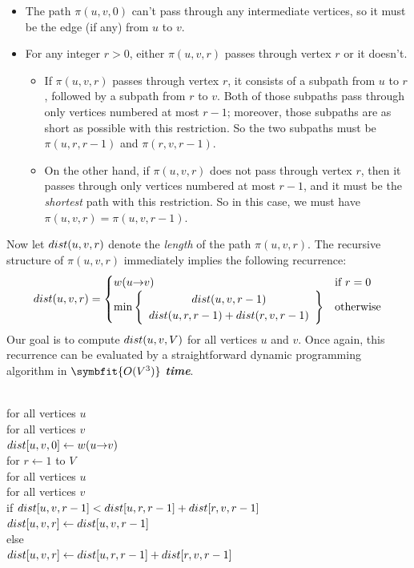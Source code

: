 \begin{itemize}
\item The path $\pi(u, v, 0)$ can’t pass through any intermediate vertices, so it must be the edge (if any) from $u$ to $v$.
\item For any integer $r > 0$, either $\pi(u, v, r)$ passes through vertex $r$ or it doesn’t.
\begin{itemize}[label=\normalfont\bfseries\textendash]
\item If $\pi(u, v, r)$ passes through vertex $r$, it consists of a subpath from $u$ to $r$, followed by a subpath from $r$ to $v$.
Both of those subpaths pass through only vertices numbered at most $r - 1$; moreover, those subpaths are as short as possible with this restriction.
So the two subpaths must be $\pi(u, r, r - 1)$ and $\pi(r, v, r - 1)$.
\item On the other hand, if $\pi(u, v, r)$ does not pass through vertex $r$, then it passes through only vertices numbered at most $r - 1$, and it must be the \textit{shortest} path with this restriction.
So in this case, we must have $\pi(u, v, r) = \pi(u, v, r - 1)$.
\end{itemize}
\end{itemize}

Now let $dist(u, v, r)$ denote the \textit{length} of the path $\pi(u, v, r)$.
The recursive structure of $\pi(u, v, r)$ immediately implies the following recurrence:
\[
dist(u, v, r) = \begin{cases}
w(u\mathord{\rightarrow}v) & \text{if } r = 0\\
\min\left\{\begin{array}{c} dist(u, v, r - 1)\\ dist(u, r, r - 1) + dist(r, v, r - 1) \end{array}\right\} & \text{otherwise}
\end{cases}
\]
Our goal is to compute $dist(u, v, V)$ for all vertices $u$ and $v$.
Once again, this recurrence can be evaluated by a straightforward dynamic programming algorithm in $\symbfit{O(V^3)}$ \textbf{\textit{time}}.

\begin{pseudocode}
\\
for all vertices $u$\\
\Indent for all vertices $v$\\
\Indent\Indent $dist[u, v, 0] \gets w(u\mathord{\rightarrow}v)$\\
for $r \gets 1$ to $V$\\
\Indent for all vertices $u$\\
\Indent\Indent for all vertices $v$\\
\Indent\Indent\Indent if $dist[u, v, r - 1] < dist[u, r, r - 1] + dist[r, v, r - 1]$\\
\Indent\Indent\Indent\Indent $dist[u, v, r] \gets dist[u, v, r - 1]$\\
\Indent\Indent\Indent else\\
\Indent\Indent\Indent\Indent $dist[u, v, r] \gets dist[u, r, r - 1] + dist[r, v, r - 1]$
\end{pseudocode}

